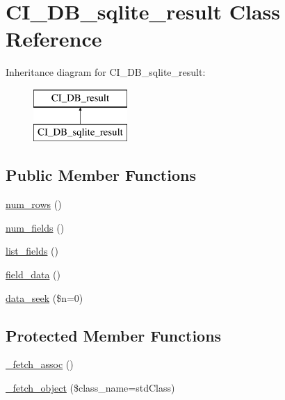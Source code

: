 \hypertarget{class_c_i___d_b__sqlite__result}{}\section{C\+I\+\_\+\+D\+B\+\_\+sqlite\+\_\+result Class Reference}
\label{class_c_i___d_b__sqlite__result}
Inheritance diagram for C\+I\+\_\+\+D\+B\+\_\+sqlite\+\_\+result\+:\begin{figure}[H]
\begin{center}
\leavevmode
\includegraphics[height=2.000000cm]{class_c_i___d_b__sqlite__result}
\end{center}
\end{figure}
\subsection*{Public Member Functions}
\begin{DoxyCompactItemize}
\item 
\mbox{\hyperlink{class_c_i___d_b__sqlite__result_ae735354ffc3e39f10f2ab668aa502ccf}{num\+\_\+rows}} ()
\item 
\mbox{\hyperlink{class_c_i___d_b__sqlite__result_a7a687a530ad264b156b0b0049b93662e}{num\+\_\+fields}} ()
\item 
\mbox{\hyperlink{class_c_i___d_b__sqlite__result_a5bb9d5516da74df6a69969705d649b67}{list\+\_\+fields}} ()
\item 
\mbox{\hyperlink{class_c_i___d_b__sqlite__result_a6daba05322a6b3fe8965f1a871375722}{field\+\_\+data}} ()
\item 
\mbox{\hyperlink{class_c_i___d_b__sqlite__result_a077f498a820453d333ef7b05c0c414e2}{data\+\_\+seek}} (\$n=0)
\end{DoxyCompactItemize}
\subsection*{Protected Member Functions}
\begin{DoxyCompactItemize}
\item 
\mbox{\hyperlink{class_c_i___d_b__sqlite__result_adb87dbafb01e2c78adaae751aa45159f}{\+\_\+fetch\+\_\+assoc}} ()
\item 
\mbox{\hyperlink{class_c_i___d_b__sqlite__result_ac661c6b061c0324ef9a35e7384fcbd5f}{\+\_\+fetch\+\_\+object}} (\$class\+\_\+name=\textquotesingle{}std\+Class\textquotesingle{})
\end{DoxyCompactItemize}
